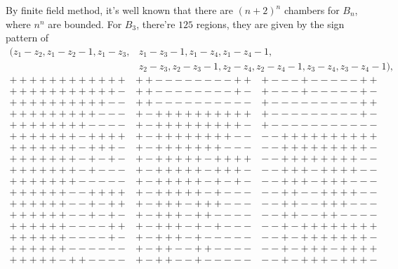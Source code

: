 \documentclass[12pt]{article}
\theoremstyle{definition}
\theoremstyle{plain}
\begin{document}
By finite field method, it's well known that there are $(n+2)^n$ chambers for $B_n$, where $n^n$ are bounded. For $B_3$, there're $125$ regions, they are given by the sign pattern of 
\begin{align*}
    (z_1-z_2,z_1-z_2-1,z_1-z_3,&z_1-z_3-1,z_1-z_4,z_1-z_4-1,\\
    &z_2-z_3,z_2-z_3-1,z_2-z_4,z_2-z_4-1,z_3-z_4,z_3-z_4-1),
\end{align*}
\[
\begin{array}{lcr}
    + + + + + + + + + + + + & + + - - - - - - - - + + & + - - - + - - - - - + + \\
    + + + + + + + + + + + - & + + - - - - - - - - + - & + - - - + - - - - - + - \\
    + + + + + + + + + + - - & + + - - - - - - - - - - & + - - - - - - - - - + + \\
    + + + + + + + + + - - - & + - + + + + + + + + + + & + - - - - - - - - - + - \\
    + + + + + + + + - - - - & + - + + + + + + + + + - & + - - - - - - - - - - - \\
    + + + + + + + - + + + + & + - + + + + + + + + - - & - - + + + + + + + + + + \\
    + + + + + + + - + + + - & + - + + + + + + + - - - & - - + + + + + + + + + - \\
    + + + + + + + - + - + - & + - + + + + + - + + + + & - - + + + + + + + + - - \\
    + + + + + + + - + - - - & + - + + + + + - + + + - & - - + + + - + + + + - - \\
    + + + + + + + - - - - - & + - + + + + + - + - + - & - - + + + - + + + - - - \\
    + + + + + + - - + + + + & + - + + + + + - + - - - & - - + + - - + + + + - - \\
    + + + + + + - - + - + + & + - + + + - + + + - - - & - - + + - - + + + - - - \\
    + + + + + + - - + - + - & + - + + + - + + - - - - & - - + + - - + + - - - - \\
    + + + + + + - - - - + + & + - + + + - + - + - - - & - - + - + + + + + + + + \\
    + + + + + + - - - - + - & + - + + + - + - - - - - & - - + - + + + + + + + - \\
    + + + + + + - - - - - - & + - + + - - + + - - - - & - - + - + + + - + + + + \\
    + + + + + - + + - - - - & + - + + - - + - - - - - & - - + - + + + - + + + - \\

\end{array}\]
\end{document}
